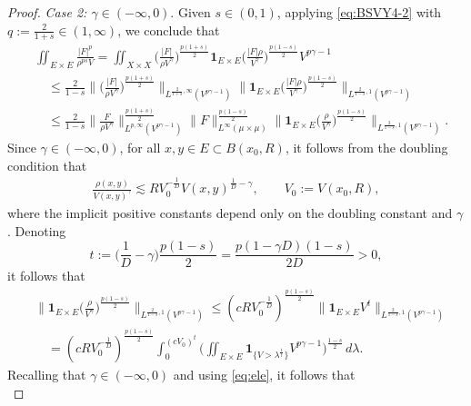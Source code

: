 \documentclass[11pt]{amsart}
\theoremstyle{definition}
\theoremstyle{remark}
\numberwithin{equation}{section}
\newcommand{\Norm}[2]{\|#1\|_{#2}}
\newcommand{\BNorm}[2]{\Big\|#1\Big\|_{#2}}
\begin{document}
\begin{proof}
\emph{Case 2: $\gamma\in(-\infty,0)$}.
Given $s\in(0,1)$, applying \eqref{eq:BSVY4-2} with
$q:=\frac{2}{1+s}\in(1,\infty)$,
we conclude that
\begin{equation}
\begin{split}
&\iint_{E\times E}\frac{|F|^p}{\rho^{ps}V}%
=\iint_{X\times X}\Big(\frac{|F|}{\rho V^\gamma}\Big)^{\frac{p(1+s)}{2}}
\mathbf{1}_{E\times E}\Big(\frac{|F| \rho}{V^\gamma}\Big)^{\frac{p(1-s)}{2}}
V^{p\gamma-1}\\
&\quad\le \frac{2}{1-s}
\BNorm{\Big(\frac{|F|}{\rho V^\gamma}\Big)^{\frac{p(1+s)}{2}}}{
L^{\frac{2}{1+s},\infty} (V^{p\gamma-1})}%
\BNorm{\mathbf{1}_{E\times E}\Big(\frac{|F| \rho}{V^\gamma}\Big)^{\frac{p(1-s)}{2}}}{
L^{\frac{2}{1-s},1} (V^{p\gamma-1})}\\
&\quad\le \frac{2}{1-s}
\BNorm{\frac{F}{\rho V^\gamma}}{
L^{p,\infty} (V^{p\gamma-1})}^{\frac{p(1+s)}{2}}\Norm{F}{L^\infty(\mu\times\mu)}
^{\frac{p(1-s)}{2}}%
\BNorm{\mathbf{1}_{E\times E}\Big(\frac{\rho}{V^\gamma}\Big)^{\frac{p(1-s)}{2}}}{
L^{\frac{2}{1-s},1} (V^{p\gamma-1})}.
\end{split}
\end{equation}
Since $\gamma\in(-\infty,0)$, for all $x,y\in E\subset B(x_0,R)$,
it follows from the doubling condition that
\begin{align*}
\frac{\rho(x,y)}{V(x,y)^\gamma}
\lesssim RV_0^{-\frac1D}V(x,y)^{\frac1D-\gamma},
\qquad
V_0:=V(x_0,R),
\end{align*}
where the implicit positive constants depend only on the doubling constant and $\gamma$.
Denoting
\begin{equation*}
  t:=\Big(\frac 1D-\gamma\Big)\frac{p(1-s)}{2}=\frac{p(1-\gamma D)(1-s)}{2D}>0,
\end{equation*}
it follows that
\begin{align*}
  &\BNorm{\mathbf{1}_{E\times E}\Big(\frac{\rho}{V^\gamma}\Big)^{\frac{p(1-s)}{2}}}{
  L^{\frac{2}{1-s},1} (V^{p\gamma-1})}
  \leq (cRV_0^{-\frac{1}{D}})^{\frac{p(1-s)}{2}}
  \BNorm{\mathbf{1}_{E\times E} V^t}{L^{\frac{2}{1-s},1}(V^{p\gamma-1})} \\
  &\quad=(cRV_0^{-\frac{1}{D}})^{\frac{p(1-s)}{2}}\int_{0}^{(cV_0)^t}
  \Big(\iint_{E\times E}\mathbf{1}_{\{V>\lambda^{\frac 1t}\}}
  V^{p\gamma-1}\Big)^{\frac{1-s}{2}}\,d\lambda.
\end{align*}
Recalling that $\gamma\in(-\infty,0)$ and using \eqref{eq:ele}, it follows that
\begin{equation*}

\end{equation*}
\end{proof}
\end{document}
